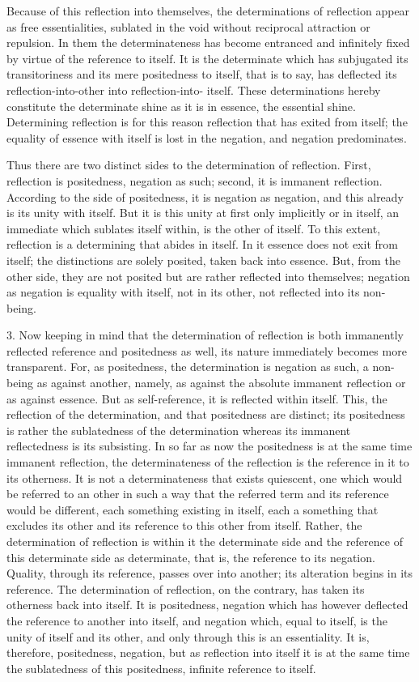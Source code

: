 Because of this reflection into themselves,
the determinations of reflection appear as
free essentialities, sublated in the void
without reciprocal attraction or repulsion.
In them the determinateness has become entranced
and infinitely fixed by virtue of the reference to itself.
It is the determinate which has subjugated its transitoriness
and its mere positedness to itself, that is to say,
has deflected its reflection-into-other into reflection-into- itself.
These determinations hereby constitute the determinate shine
as it is in essence, the essential shine.
Determining reflection is for this reason
reflection that has exited from itself;
the equality of essence with itself is
lost in the negation, and negation predominates.

Thus there are two distinct sides to the determination of reflection.
First, reflection is positedness, negation as such;
second, it is immanent reflection.
According to the side of positedness,
it is negation as negation,
and this already is its unity with itself.
But it is this unity at first only implicitly or in itself,
an immediate which sublates itself within, is the other of itself.
To this extent, reflection is a determining that abides in itself.
In it essence does not exit from itself;
the distinctions are solely posited,
taken back into essence.
But, from the other side, they are not posited
but are rather reflected into themselves;
negation as negation is equality with itself,
not in its other, not reflected into its non-being.

3. Now keeping in mind that the determination of reflection is
both immanently reflected reference and positedness as well,
its nature immediately becomes more transparent.
For, as positedness, the determination is negation as such,
a non-being as against another, namely,
as against the absolute immanent reflection or as against essence.
But as self-reference, it is reflected within itself.
This, the reflection of the determination,
and that positedness are distinct;
its positedness is rather the sublatedness of the determination
whereas its immanent reflectedness is its subsisting.
In so far as now the positedness is
at the same time immanent reflection,
the determinateness of the reflection is
the reference in it to its otherness.
It is not a determinateness that exists quiescent,
one which would be referred to an other
in such a way that the referred term
and its reference would be different,
each something existing in itself,
each a something that excludes its other
and its reference to this other from itself.
Rather, the determination of reflection is
within it the determinate side
and the reference of this determinate side as determinate,
that is, the reference to its negation.
Quality, through its reference, passes over into another;
its alteration begins in its reference.
The determination of reflection, on the contrary,
has taken its otherness back into itself.
It is positedness, negation which has however deflected
the reference to another into itself,
and negation which, equal to itself,
is the unity of itself and its other,
and only through this is an essentiality.
It is, therefore, positedness, negation,
but as reflection into itself it is at the same time
the sublatedness of this positedness,
infinite reference to itself.

